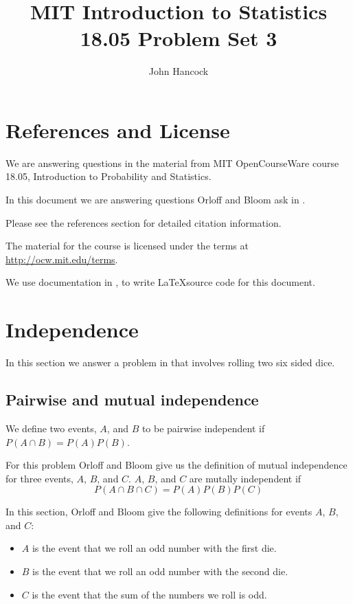 \documentclass[a4paper,11pt]{article}
\author{John Hancock}
\title{MIT Introduction to Statistics 18.05 Problem Set 3 }
\begin{document}
\maketitle
\tableofcontents
\section{References and License}
We are answering questions in the material from MIT OpenCourseWare
course 18.05, Introduction to Probability and Statistics.

In this document we are answering questions Orloff and Bloom ask in
\cite{probSet3}.

Please see the references section for detailed citation information.

The material for the course is licensed under the terms at
\url{http://ocw.mit.edu/terms}.

We use documentation in \cite{vennDiagram}, \cite{nodePos}
to write \LaTeX source code for this document.
\section{Independence}

In this section we answer a problem in \cite{probSet2} that involves rolling
two six sided dice.

\subsection{Pairwise and mutual independence}
We define two events, $A$, and $B$ to be pairwise independent if
$P \left( A \cap B \right) = P \left( A \right) P \left(B \right)$.

For this problem Orloff and Bloom give us the definition of mutual independence
for three events, $A$, $B$, and $C$.  $A$, $B$, and $C$ are mutally independent
if
\begin{equation}
	P \left( A \cap B \cap C\right)
	= P \left(A \right) P \left(B \right) P \left( C \right)
\end{equation}

In this section, Orloff and Bloom give the following definitions for events
$A$, $B$, and $C$:
\begin{itemize}
	\item $A$ is the event that we roll an odd number with the first die.
	\item $B$ is the event that we roll an odd number with the second die.
	\item $C$ is the event that the sum of the numbers we roll is odd.
\end{itemize}
\end{document}
